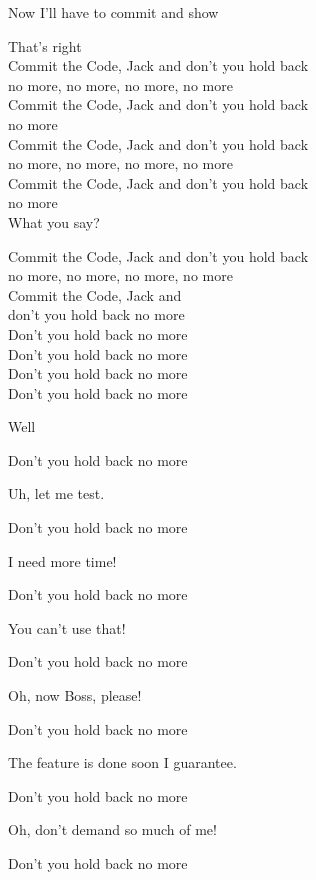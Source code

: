 \documentclass[11pt,a5paper]{article}
\begin{document}
				\hfill Now I’ll have to commit and show 
				
				That’s right \\
				Commit the Code, Jack and don’t you hold back \\
				no more, no more, no more, no more \\
				Commit the Code, Jack and don’t you hold back \\ no more \\
				Commit the Code, Jack and don’t you hold back \\
				no more, no more, no more, no more \\
				Commit the Code, Jack and don’t you hold back \\ no more \\
				
				\hfill What you say?

				Commit the Code, Jack and don’t you hold back \\
				no more, no more, no more, no more \\
				Commit the Code, Jack and \\ don’t you hold back no more \\
				Don’t you hold back no more \\
				Don’t you hold back no more \\
				Don’t you hold back no more \\
				Don’t you hold back no more
				
				\hfill Well
				
				Don’t you hold back no more
				
				\hfill Uh, let me test.
				
				Don’t you hold back no more
				
				\hfill I need more time!
				
				Don’t you hold back no more
				
				\hfill You can’t use that!
				
				Don’t you hold back no more
				
				\hfill Oh, now Boss, please!
				
				Don’t you hold back no more
				
				\hfill The feature is done soon I guarantee.
				
				Don’t you hold back no more
				
				\hfill Oh, don’t demand so much of me!
				
				Don’t you hold back no more
				\pagebreak
\end{document}

